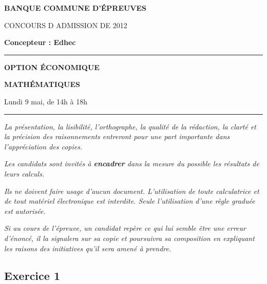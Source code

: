 \documentclass[11pt]{article}%
\begin{document}

\begin{center}
{\LARG\E\textbf{BANQUE COMMUNE D'ÉPREUVES}}



{\large \textsc{CONCOURS D ADMISSION DE 2012}}



{\large \textbf{Concepteur : Edhec}}



\rule{2.39cm}{0.05cm}



{\Large \textbf{OPTION ÉCONOMIQUE}}



{\Large \textbf{MATHÉMATIQUES }}



{\Large Lundi 9 mai, de 14h à 18h}



\rule{2.39cm}{0.05cm}
\end{center}

\textit{La présentation, la lisibilité, l'orthographe, la qualité
de la rédaction, la clarté et la précision des raisonnements
entreront pour une part importante dans l'appréciation des copies.}

\textit{Les candidats sont invités à \textbf{encadrer} dans la mesure
du possible les résultats de leurs calculs.}

\textit{Ils ne doivent faire usage d'aucun document. L'utilisation de
toute
calculatrice et de tout matériel électronique est interdite. Seule
l'utilisation d'une règle graduée est autorisée.}

\textit{Si au cours de l'épreuve, un candidat repère ce qui lui semble
être une erreur d'énoncé, il la signalera sur sa copie et
poursuivra sa composition en expliquant les raisons des initiatives
qu'il sera
amené à prendre.}

\vspace*{3cm}

\subsection*{Exercice 1 }
\end{document}

